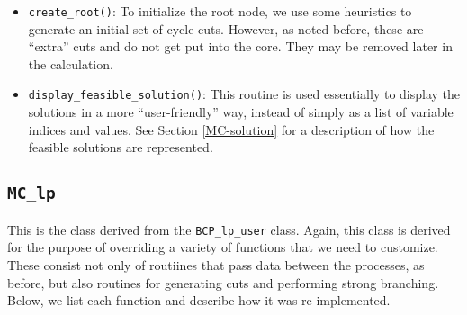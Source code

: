\begin{itemize}
        \item {\tt create\_root()}: To initialize the root node, we
        use some heuristics to generate an initial set of cycle cuts.
        However, as noted before, these are ``extra'' cuts and do not
        get put into the core. They may be removed later in the
        calculation. 

        \item {\tt display\_feasible\_solution()}: This routine is
        used essentially to display the solutions in a more
        ``user-friendly'' way, instead of simply as a list of variable
        indices and values. See Section \ref{MC-solution} for a
        description of how the feasible solutions are represented.

\end{itemize}

\subsection{\tt MC\_lp}
\label{MC-lp}

This is the class derived from the {\tt BCP\_lp\_user} class. Again, this
class is derived for the purpose of overriding a variety of functions
that we need to customize. These consist not only of routiines that pass
data between the processes, as before, but also routines for
generating cuts and performing strong branching. Below, we list each
function and describe how it was re-implemented.

